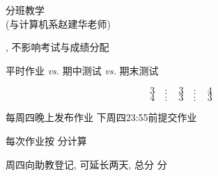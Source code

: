
\begin{frame}{}
  \begin{center}

    \pause
  \end{center}
\end{frame}

\begin{frame}{}
  \begin{center}
    {\large 分班教学 \\ (与计算机系赵建华老师)}

    \vspace{0.60cm}
    {\large {}, 不影响考试与成绩分配}
  \end{center}
\end{frame}

\begin{frame}{}
  \begin{center}
    {\large 平时作业 {\it vs.} 期中测试 {\it vs.} 期末测试}

    \[
      3 \quad:\quad 3 \quad:\quad 4
    \]
    \[
      4 \quad:\quad 3 \quad:\quad 3
    \]

    \vspace{0.80cm}
  \end{center}
\end{frame}

\begin{frame}{}
  \begin{center}
    每周四晚上发布作业 \qquad 下周四23:55前提交作业

    \vspace{1.00cm}
    每次作业按  分计算

    \vspace{0.50cm}
     周四向助教登记, 可延长两天, 总分  分

    \vspace{0.50cm}
  \end{center}
\end{frame}

